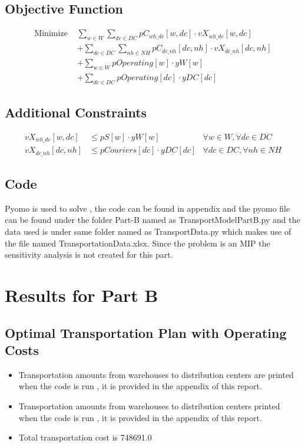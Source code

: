 \documentclass[12pt]{article}
\begin{document}
\subsection*{Objective Function}
\begin{align*}
\text{Minimize } & \sum_{w \in W} \sum_{dc \in DC} pC_{wh\_dc}[w, dc] \cdot vX_{wh\_dc}[w, dc] \\
& + \sum_{dc \in DC} \sum_{nh \in NH} pC_{dc\_nh}[dc, nh] \cdot vX_{dc\_nh}[dc, nh] \\
& + \sum_{w \in W} pOperating[w] \cdot yW[w] \\
& + \sum_{dc \in DC} pOperating[dc] \cdot yDC[dc]
\end{align*}


\subsection*{Additional Constraints}
\begin{align*}
vX_{wh\_dc}[w, dc] & \leq pS[w] \cdot yW[w] & \forall w \in W, \forall dc \in DC \\
vX_{dc\_nh}[dc, nh] & \leq pCouriers[dc] \cdot yDC[dc] & \forall dc \in DC, \forall nh \in NH
\end{align*}

\subsection*{Code}
Pyomo is used to solve , the code can be found in appendix and the pyomo file can be found under the folder Part-B named as TransportModelPartB.py and the data used is under same folder named as TransportData.py which makes use of the file named TransportationData.xlsx. Since the problem is an MIP the sensitivity analysis is not created for this part.
\section*{Results for Part B}
\subsection*{Optimal Transportation Plan with Operating Costs}
\begin{itemize}
    \item Transportation amounts from warehouses to distribution centers are printed when the code is run , it is provided in the appendix of this report.
    \item Transportation amounts from warehouses to distribution centers printed when the code is run , it is provided in the appendix of this report.
    \item Total transportation cost is 748691.0
\end{itemize}
\end{document}
